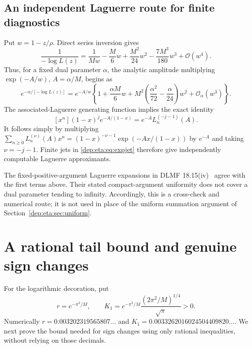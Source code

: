 \documentclass[11pt]{article}
\theoremstyle{definition}\newtheorem{definition}[theorem]{Definition}
\theoremstyle{remark}\newtheorem{remark}[theorem]{Remark}
\newcommand{\OO}{\mathcal O}
\begin{document}
\subsection{An independent Laguerre route for finite diagnostics}
Put $w=1-z/\rho$. Direct series inversion gives
\begin{equation}\label{dep:eta:eq:localjet}
 \frac1{-\log L(z)}
   =\frac1{Mw}-\frac M6w+\frac{M^2}{24}w^2
                         -\frac{7M^3}{180}w^3+\OO(w^4).
\end{equation}
Thus, for a fixed dual parameter $\alpha$, the analytic amplitude
multiplying $\exp(-A/w)$, $A=\alpha/M$, begins as
\begin{equation}\label{dep:eta:eq:expjet}
 e^{-\alpha/[-\log L(z)]}
 =e^{-A/w}\left\{1+\frac{\alpha M}{6}w
       +M^2\left(\frac{\alpha^2}{72}-\frac\alpha{24}\right)w^2
       +\OO_\alpha(w^3)\right\}.
\end{equation}
The associated-Laguerre generating function implies the exact identity
\begin{equation}\label{dep:eta:eq:laguerre}
 [x^n](1-x)^j e^{-A/(1-x)}=e^{-A}L_n^{(-j-1)}(A).
\end{equation}
It follows simply by multiplying
$\sum_{n\ge0}L_n^{(\nu)}(A)x^n=(1-x)^{-\nu-1}
\exp(-Ax/(1-x))$ by $e^{-A}$ and taking $\nu=-j-1$.
Finite jets in \eqref{dep:eta:eq:expjet} therefore give independently
computable Laguerre approximants.

The fixed-positive-argument Laguerre expansions in
DLMF 18.15(iv)~\cite{laguerre} agree with the first terms above.
Their stated compact-argument uniformity does not cover a dual
parameter tending to infinity. Accordingly, this is a cross-check and
numerical route; it is not used in place of the uniform summation
argument of Section~\ref{dep:eta:sec:uniform}.

\section{A rational tail bound and genuine sign changes}\label{dep:eta:sec:sign}
For the logarithmic decoration, put
\[
 r=e^{-\pi^2/M},\qquad
 K_1=e^{-\pi^2/M}\frac{(2\pi^2/M)^{1/4}}{\sqrt\pi}>0.
\]
Numerically $r=0.003202319565807\ldots$ and
$K_1=0.0033262016024504409820\ldots$. We next prove the bound needed
for sign changes using only rational inequalities, without relying on
those decimals.
\end{document}
